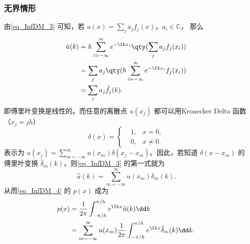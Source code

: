 \subsubsection{无界情形}
由\autoref{eq_InfDM_3}  可知，若 $u(x)=\sum\limits_{j}a_jf_j(x)$，$a_i\in\mathbb C$， 那么
\begin{equation}
\begin{aligned}
\hat u(k)&=h\sum_{i=-\infty}^{\infty}e^{-\I kx_i}\qty(\sum\limits_{j}a_jf_j(x_i))\\
&=\sum\limits_{j}a_j\qty(h\sum_{i=-\infty}^{\infty}e^{-\I kx_i}f_j(x_i))\\
&=\sum_{j}a_j\hat f_j(k).
\end{aligned}~
\end{equation}
即傅里叶变换是线性的。而任意的离散点 $u(x_j)$ 都可以用Kronecker Delta 函数（$x_j=jh$） 
\begin{equation}
\delta(x)=\left\{\begin{aligned}
&1,&x=0,\\
&0,&x\neq0.
\end{aligned}\right.~
\end{equation}
表示为 $u(x_j)=\sum\limits_{m=-\infty}^{\infty}u(x_m)\delta(x_j-x_m)$。因此，若知道 $\delta(x-x_m)$ 的傅里叶变换 $\hat\delta_m(k)$，则\autoref{eq_InfDM_3} 的第一式就为 
\begin{equation}
\hat u(k)=\sum\limits_{m=-\infty}^\infty u(x_m)\hat\delta_m(k).~
\end{equation}
从而\autoref{eq_InfDM_4} 的 $p(x)$ 成为
\begin{equation}
\begin{aligned}
p(x)&=\frac{1}{2\pi}\int_{-\pi/h}^{\pi/h} e^{\I kx}\hat u(k)\dd k\\
&=\sum\limits_{m=-\infty}^\infty u(x_m)\frac{1}{2\pi}\int_{-\pi/h}^{\pi/h} e^{\I kx}\hat\delta_m(k)\dd k.
\end{aligned}~
\end{equation}

